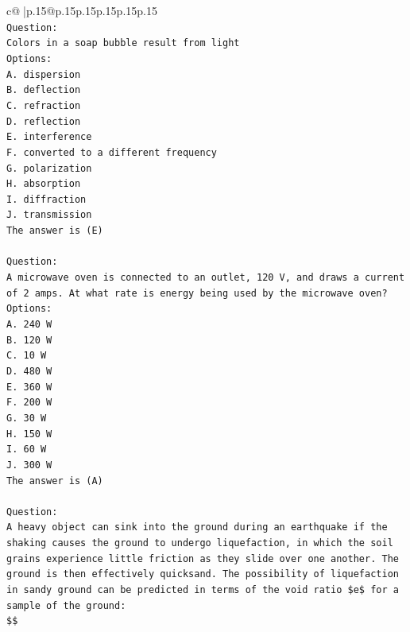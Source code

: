\documentclass{article}
\begin{document}
{\begin{supertabular}{c@{$\;$}|p{.15\linewidth}@{}p{.15\linewidth}p{.15\linewidth}p{.15\linewidth}p{.15\linewidth}p{.15\linewidth}}
{{{\\ 
\texttt{Question:} \\
\texttt{Colors in a soap bubble result from light} \\
\texttt{Options:} \\
\texttt{A. dispersion} \\
\texttt{B. deflection} \\
\texttt{C. refraction} \\
\texttt{D. reflection} \\
\texttt{E. interference} \\
\texttt{F. converted to a different frequency} \\
\texttt{G. polarization} \\
\texttt{H. absorption} \\
\texttt{I. diffraction} \\
\texttt{J. transmission} \\
\texttt{The answer is (E)} \\
\\ 
\texttt{Question:} \\
\texttt{A microwave oven is connected to an outlet, 120 V, and draws a current of 2 amps. At what rate is energy being used by the microwave oven?} \\
\texttt{Options:} \\
\texttt{A. 240 W} \\
\texttt{B. 120 W} \\
\texttt{C. 10 W} \\
\texttt{D. 480 W} \\
\texttt{E. 360 W} \\
\texttt{F. 200 W} \\
\texttt{G. 30 W} \\
\texttt{H. 150 W} \\
\texttt{I. 60 W} \\
\texttt{J. 300 W} \\
\texttt{The answer is (A)} \\
\\ 
\texttt{Question:} \\
\texttt{A heavy object can sink into the ground during an earthquake if the shaking causes the ground to undergo liquefaction, in which the soil grains experience little friction as they slide over one another. The ground is then effectively quicksand. The possibility of liquefaction in sandy ground can be predicted in terms of the void ratio \$e\$ for a sample of the ground:} \\
\texttt{\$\$} \\
}}}
\end{supertabular}}
\end{document}

